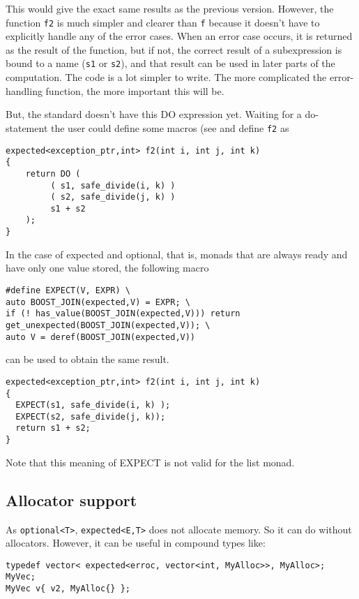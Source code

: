 \documentclass[a4paper,10pt]{article}
\newcommand{\cpp}[1]{\lstinline{#1}}
\begin{document}
This would give the exact same results as the previous version. However, the function \cpp{f2} is much simpler and clearer than \cpp{f} because it doesn't have to explicitly handle any of the error cases. When an error case occurs, it is returned as the result of the function, but if not, the correct result of a subexpression is bound to a name (\cpp{s1} or \cpp{s2}), and that result can be used in later parts of the computation. The code is a lot simpler to write. The more complicated the error-handling function, the more important this will be.

But, the standard doesn't have this DO expression yet.
Waiting for a do-statement the user could define some macros (see \cite{monad_do_poc} and define \cpp{f2} as

\begin{lstlisting}
expected<exception_ptr,int> f2(int i, int j, int k)
{
    return DO (
         ( s1, safe_divide(i, k) )
         ( s2, safe_divide(j, k) )
         s1 + s2 
    );
}
\end{lstlisting}

In the case of expected and optional, that is, monads that are always ready and have only one value stored, the following macro 

\begin{lstlisting}
#define EXPECT(V, EXPR) \
auto BOOST_JOIN(expected,V) = EXPR; \
if (! has_value(BOOST_JOIN(expected,V))) return get_unexpected(BOOST_JOIN(expected,V)); \
auto V = deref(BOOST_JOIN(expected,V))
\end{lstlisting}

can be used to obtain the same result.

\begin{lstlisting}
expected<exception_ptr,int> f2(int i, int j, int k)
{
  EXPECT(s1, safe_divide(i, k) );
  EXPECT(s2, safe_divide(j, k));
  return s1 + s2;
}
\end{lstlisting}

Note that this meaning of EXPECT is not valid for the list monad. 

\subsection{Allocator support}

As \cpp{optional<T>},  \cpp{expected<E,T>} does not allocate memory. So it can do without allocators. However, it can be useful in compound types like:

\begin{lstlisting}
typedef vector< expected<erroc, vector<int, MyAlloc>>, MyAlloc>; MyVec;
MyVec v{ v2, MyAlloc{} };
\end{lstlisting}
\end{document}
